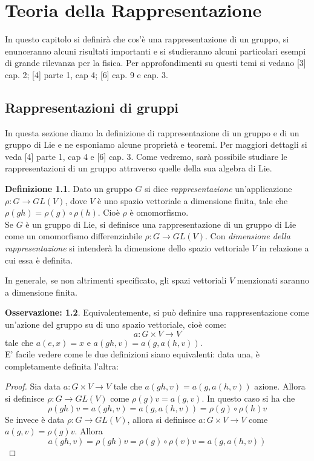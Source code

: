 \documentclass[12pt,a4paper]{report}
\theoremstyle{definition}
\newtheorem{Def}{Definizione}[chapter]
\theoremstyle{Theorem}
\theoremstyle{definition}
\theoremstyle{definition}
\theoremstyle{definition}
\newtheorem{Obs}[Def]{Osservazione:}
\begin{document}
\chapter{Teoria della Rappresentazione}
\label{chap:3}
In questo capitolo si definirà che cos'è una rappresentazione di un gruppo, si enunceranno alcuni risultati importanti e si studieranno alcuni particolari esempi di grande rilevanza per la fisica.
Per approfondimenti su questi temi si vedano [3] cap. 2; [4] parte 1, cap 4; [6] cap. 9 e cap. 3.
\section{Rappresentazioni di gruppi}
In questa sezione diamo la definizione di rappresentazione di un gruppo e di un gruppo di Lie e ne esponiamo alcune proprietà e teoremi. Per maggiori dettagli si veda [4] parte 1, cap 4 e [6] cap. 3.
Come vedremo, sarà possibile studiare le rappresentazioni di un gruppo attraverso quelle della sua algebra di Lie.
\begin{Def}
Dato un gruppo $G$ si dice \textit{rappresentazione} un'applicazione\\ $\rho:G\rightarrow GL(V)$, dove $V$ è uno spazio vettoriale a dimensione finita, tale che $\rho(gh)=\rho(g)\circ\rho(h)$. Cioè $\rho$ è omomorfismo.\\
Se $G$ è un gruppo di Lie, si definisce una rappresentazione di un gruppo di Lie come un omomorfismo differenziabile $\rho:G\rightarrow GL(V)$. Con \textit{dimensione della rappresentazione} si intenderà la dimensione dello spazio vettoriale $V$ in relazione a cui essa è definita.
\end{Def}
In generale, se non altrimenti specificato, gli spazi vettoriali $V$ menzionati saranno a dimensione finita.
\begin{Obs}
	Equivalentemente, si può definire una rappresentazione come un'azione del gruppo su di uno spazio vettoriale, cioè come:
	$$a:G\times V\rightarrow V$$
	tale che $a(e,x)=x$ e $a(gh,v)=a(g,a(h,v))$.\\
	E' facile vedere come le due definizioni siano equivalenti: data una, è completamente definita l'altra:
	\begin{proof}
		Sia data $a:G\times V\rightarrow V$
		tale che $a(gh,v)=a(g,a(h,v))$ azione. Allora si definisce $\rho:G\rightarrow GL(V)$ come $\rho(g)v=a(g,v)$. In questo caso si ha che $$\rho(gh)v=a(gh,v)=a(g,a(h,v))=\rho(g)\circ\rho(h)v$$
		Se invece è data $\rho:G\rightarrow GL(V)$, allora si definisce $a:G\times V\rightarrow V$ come $a(g,v)=\rho(g)v$. Allora $$a(gh,v)=\rho(gh)v=\rho(g)\circ\rho(v)v=a(g,a(h,v))$$
	\end{proof}
\end{Obs}
\end{document}
